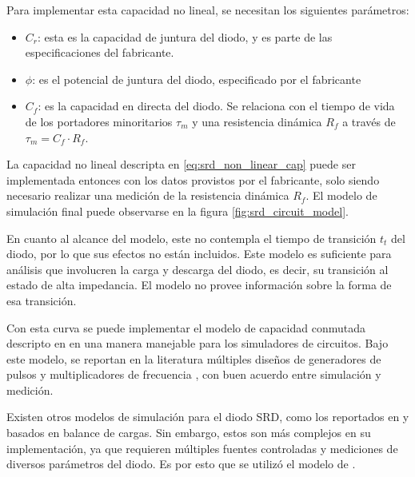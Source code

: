 Para implementar esta capacidad no lineal, se necesitan los siguientes
parámetros:

\begin{itemize}
    \item $C_r$: esta es la capacidad de juntura del diodo, y es parte de las
        especificaciones del fabricante.
    \item $\phi$: es el potencial de juntura del diodo, especificado por el
        fabricante
    \item $C_f$: es la capacidad en directa del diodo. Se relaciona con el
        tiempo de vida de los portadores minoritarios $\tau_m$ y una resistencia
        dinámica $R_f$ a través de $\tau_m = C_f \cdot R_f$.
        \cite{Kotzebue1965}
\end{itemize}

La capacidad no lineal descripta en \ref{eq:srd_non_linear_cap} puede ser
implementada entonces con los datos provistos por el fabricante, solo siendo
necesario realizar una medición de la resistencia dinámica $R_f$. El modelo de
simulación final puede observarse en la figura \ref{fig:srd_circuit_model}.

En cuanto al alcance del modelo, este no contempla el tiempo de transición $t_t$
del diodo, por lo que sus efectos no están incluidos. Este modelo es suficiente
para análisis que involucren la carga y descarga del diodo, es decir, su
transición al estado de alta impedancia. El modelo no provee información sobre
la forma de esa transición.

Con esta curva se puede implementar el modelo de capacidad conmutada descripto
en \cite{moll1969} en una manera manejable para los simuladores de circuitos.
Bajo este modelo, se reportan en la literatura múltiples diseños de generadores
de pulsos \cite{Ruengwaree2006} \cite{Rahman2022} y multiplicadores de
frecuencia \cite{zhang1996} \cite{Heymann2001}, con buen acuerdo entre
simulación y medición.

Existen otros modelos de simulación para el diodo SRD, como los reportados en
\cite{Opalska1997} y \cite{Shevchenko2022} basados en balance de cargas. Sin
embargo, estos son más complejos en su implementación, ya que requieren
múltiples fuentes controladas y mediciones de diversos parámetros del diodo. Es
por esto que se utilizó el modelo de \cite{zhang1995}.

